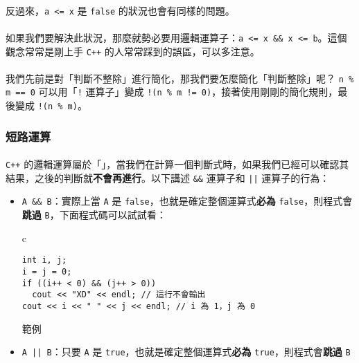 \documentclass[12pt,a4paper,oneside]{article}
\begin{document}
\begin{CJK}{UTF8}{bkai}
\paragraph{}反過來，\lstinline!a <= x! 是 \lstinline!false! 的狀況也會有同樣的問題。
\paragraph{}如果我們要解決此狀況，那麼就勢必要用邏輯運算子：\lstinline!a <= x && x <= b!。這個觀念常常是剛上手 \texttt{C++} 的人常常踩到的誤區，可以多注意。

\paragraph{}我們先前是對「判斷不整除」進行簡化，那我們要怎麼簡化「判斷整除」呢？ \lstinline!n % m == 0! 可以用「\lstinline"!" 運算子」變成 \lstinline"!(n % m != 0)"，接著使用剛剛的簡化規則，最後變成 \lstinline"!(n % m)"。

\subsubsection{短路運算}

\paragraph{}\texttt{C++} 的邏輯運算屬於「」，當我們在計算一個判斷式時，如果我們已經可以確認其結果，之後的判斷就\textbf{不會再進行}。以下講述 \lstinline!&&! 運算子和 \lstinline!||! 運算子的行為：

\begin{itemize}
\item \lstinline!A && B!：實際上當 \lstinline!A! 是 \lstinline!false!，也就是確定整個運算式\textbf{必為} \lstinline!false!，則程式會\textbf{跳過} \lstinline!B!，下面程式碼可以試試看：

\begin{code}[h!]
\centering
\begin{tabular}{c}
\begin{lstlisting}
int i, j;
i = j = 0;
if ((i++ < 0) && (j++ > 0))
  cout << "XD" << endl; // 這行不會輸出
cout << i << " " << j << endl; // i 為 1，j 為 0
\end{lstlisting}
\end{tabular}
\caption{範例}
\label{basic:cpp:code:short:cut}
\end{code}

\item \lstinline!A || B!：只要 \lstinline!A! 是 \lstinline!true!，也就是確定整個運算式\textbf{必為} \lstinline!true!，則程式會\textbf{跳過} \lstinline!B!


\end{itemize}
\end{CJK}
\end{document}
